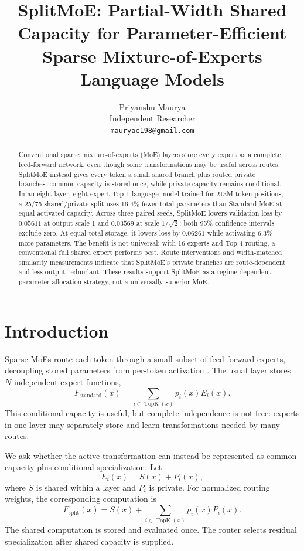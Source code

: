 \documentclass[10pt]{article}
\title{SplitMoE: Partial-Width Shared Capacity for Parameter-Efficient\\Sparse Mixture-of-Experts Language Models}
\author{Priyanshu Maurya\\Independent Researcher\\\texttt{mauryac198@gmail.com}}
\date{}
\begin{document}
\maketitle

\begin{abstract}
Conventional sparse mixture-of-experts (MoE) layers store every expert as a complete feed-forward network, even though some transformations may be useful across routes. SplitMoE instead gives every token a small shared branch plus routed private branches: common capacity is stored once, while private capacity remains conditional. In an eight-layer, eight-expert Top-1 language model trained for 213M token positions, a 25/75 shared/private split uses 16.4\% fewer total parameters than Standard MoE at equal activated capacity. Across three paired seeds, SplitMoE lowers validation loss by $0.05611$ at output scale 1 and $0.03569$ at scale $1/\sqrt{2}$; both 95\% confidence intervals exclude zero. At equal total storage, it lowers loss by $0.06261$ while activating 6.3\% more parameters. The benefit is not universal: with 16 experts and Top-4 routing, a conventional full shared expert performs best. Route interventions and width-matched similarity measurements indicate that SplitMoE's private branches are route-dependent and less output-redundant. These results support SplitMoE as a regime-dependent parameter-allocation strategy, not a universally superior MoE.
\end{abstract}

\section{Introduction}
Sparse MoEs route each token through a small subset of feed-forward experts, decoupling stored parameters from per-token activation \citep{shazeer2017outrageously,lepikhin2020gshard,fedus2022switch}. The usual layer stores $N$ independent expert functions,
\begin{equation}
F_{\mathrm{standard}}(x)=\sum_{i\in\operatorname{TopK}(x)}p_i(x)E_i(x).
\end{equation}
This conditional capacity is useful, but complete independence is not free: experts in one layer may separately store and learn transformations needed by many routes.

We ask whether the active transformation can instead be represented as common capacity plus conditional specialization. Let
\begin{equation}
E_i(x)=S(x)+P_i(x),
\end{equation}
where $S$ is shared within a layer and $P_i$ is private. For normalized routing weights, the corresponding computation is
\begin{equation}
F_{\mathrm{split}}(x)=S(x)+\sum_{i\in\operatorname{TopK}(x)}p_i(x)P_i(x).
\label{eq:split}
\end{equation}
The shared computation is stored and evaluated once. The router selects residual specialization after shared capacity is supplied.
\end{document}
